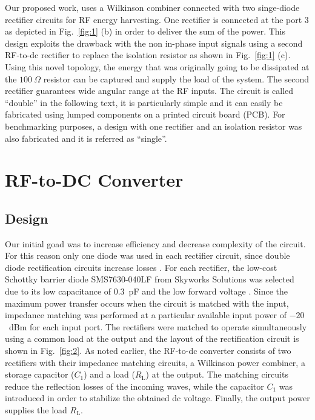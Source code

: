 \documentclass[journal]{IEEEtran}
\begin{document}
Our proposed work, uses a Wilkinson combiner connected with two singe-diode rectifier circuits for RF energy harvesting. 
%
One rectifier is connected at the port $3$ as depicted in Fig.~\ref{fig:1} (b) in order to  deliver the sum of the power.
%
This design exploits the drawback with the non in-phase input signals using a second RF-to-dc rectifier to replace the isolation resistor as shown in Fig.~\ref{fig:1} (c).  
%
Using this novel topology, the energy that was originally going to be dissipated at the  $100~\Omega$ resistor  can be captured and supply the load of the system.
%
The second rectifier guarantees wide angular range at the RF inputs.
%
The circuit is called ``double'' in the
following text, it is  particularly simple and it can easily be fabricated using lumped  components on a printed circuit board (PCB).
%
For benchmarking purposes, a design with one rectifier and an isolation resistor  
was also fabricated and it is referred as ``single''.


\section{RF-to-DC Converter}
\label{sec:rectifier}


\subsection{Design} 
\label{subsec:design}






Our initial goad was to increase efficiency  and decrease complexity of the circuit. For this reason only one diode was used in each rectifier circuit, since double diode rectification circuits increase losses \cite{nintanavongsa2012design, boaventura2013optimum}.
%
For each rectifier, the low-cost Schottky barrier diode SMS7630-040LF from Skyworks Solutions was selected due to its low capacitance of
$0.3$~pF and the low forward voltage \cite{SMS7630}.
%
Since the maximum power transfer occurs when the circuit is
matched with the input, impedance matching was 
performed at a  particular available input power of $-20$~dBm for each input port.
%
The  rectifiers were matched to operate simultaneously using a common load  at the output and the layout of the rectification circuit is  shown in Fig.~\ref{fig:2}.
%
As noted
earlier, the RF-to-dc converter consists of two rectifiers  with their impedance matching circuits, a Wilkinson power combiner,
a storage  capacitor ($C_\text{1}$) and  a load ($R_\text{L}$) at the output. 
%
The matching circuits reduce the
reflection losses of the incoming waves, while the capacitor $C_\text{1}$ was introduced in order to stabilize the obtained dc voltage. 
%
Finally, the output power supplies the load $R_\text{L}$.
\end{document}
